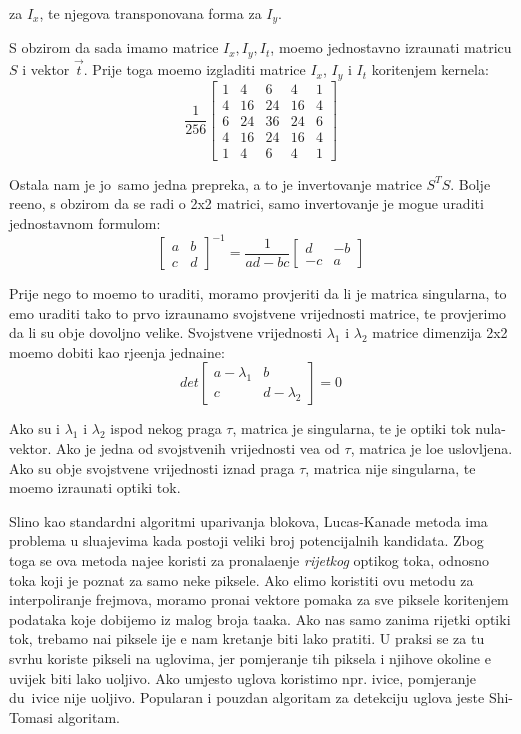 za $I_x$, te njegova transponovana forma za $I_y$.

S obzirom da sada imamo matrice $I_x,I_y,I_t$, mo\zh emo jednostavno izra\ch unati matricu $S$ i vektor $\vec{t}$. Prije toga mo\zh emo izgladiti matrice $I_x$, $I_y$ i $I_t$ kori\sh tenjem kernela:
\[
\frac{1}{256}
\begin{bmatrix}
1 & 4 & 6 & 4 & 1 \\
4 & 16 & 24 & 16 & 4 \\
6 & 24 & 36 & 24 & 6 \\
4 & 16 & 24 & 16 & 4 \\
1 & 4 & 6 & 4 & 1
\end{bmatrix}
\]

Ostala nam je jo\sh\ samo jedna prepreka, a to je invertovanje matrice $S^TS$. Bolje re\ch eno, s obzirom da se radi o 2x2 matrici, samo invertovanje je mogu\cj e uraditi jednostavnom formulom:
\[
\begin{bmatrix}
a & b \\
c & d
\end{bmatrix}^{-1}
=\frac{1}{ad-bc}
\begin{bmatrix}
d & -b \\
-c & a
\end{bmatrix}
\]

Prije nego \sh to mo\zh emo to uraditi, moramo provjeriti da li je matrica singularna, \sh to \cj emo uraditi tako \sh to prvo izra\ch unamo svojstvene vrijednosti matrice, te provjerimo da li su obje
dovoljno velike. Svojstvene vrijednosti $\lambda_1$ i $\lambda_2$ matrice dimenzija 2x2 mo\zh emo dobiti kao rje\sh enja jedna\ch ine:
\[
det
\begin{bmatrix}
a-\lambda_1 & b \\
c & d-\lambda_2
\end{bmatrix}
=0
\]

Ako su i $\lambda_1$ i $\lambda_2$ ispod nekog praga $\tau$, matrica je singularna, te je opti\ch ki tok nula-vektor. Ako je jedna od svojstvenih vrijednosti ve\cj a od $\tau$, matrica je lo\sh e uslovljena. 
Ako su obje svojstvene vrijednosti iznad praga $\tau$, matrica nije singularna, te mo\zh emo izra\ch unati opti\ch ki tok.


Sli\ch no kao standardni algoritmi uparivanja blokova, Lucas-Kanade metoda ima problema u slu\ch ajevima kada postoji veliki broj potencijalnih kandidata. Zbog toga se ova metoda naj\ch e\sh \cj e koristi
za pronala\zh enje \textit{rijetkog} opti\ch kog toka, odnosno toka koji je poznat za samo neke piksele. Ako \zh elimo koristiti ovu metodu za interpoliranje frejmova, moramo prona\cj i vektore pomaka za sve
piksele kori\sh tenjem podataka koje dobijemo iz malog broja ta\ch aka. 
Ako nas samo zanima rijetki opti\ch ki tok, trebamo na\cj i piksele \ch ije \cj e nam kretanje biti lako pratiti. U praksi se za tu svrhu koriste pikseli na uglovima, jer pomjeranje tih piksela i njihove okoline
\cj e uvijek biti lako uo\ch ljivo. Ako umjesto uglova koristimo npr. ivice, pomjeranje du\zh\ ivice nije uo\ch ljivo. Popularan i pouzdan algoritam za detekciju uglova jeste Shi-Tomasi algoritam\cite{opencvshitomasi}.